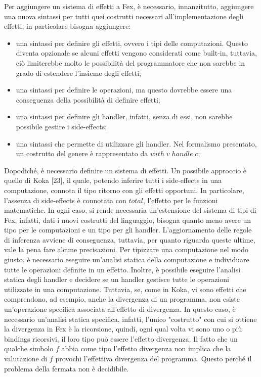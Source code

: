 \documentclass[10pt,a4paper]{article}
\begin{document}
Per aggiungere un sistema di effetti a Fex, è necessario, innanzitutto, aggiungere una nuova sintassi per tutti quei
costrutti necessari all'implementazione degli effetti, in particolare bisogna aggiungere:
\begin{itemize}
    \item una sintassi per definire gli effetti, ovvero i tipi delle computazioni. Questo diventa opzionale se alcuni
    effetti vengono considerati come built-in, tuttavia, ciò limiterebbe molto le possibilità del programmatore che non
    sarebbe in grado di estendere l'insieme degli effetti;
    \item una sintassi per definire le operazioni, ma questo dovrebbe essere una conseguenza della possibilità di
    definire effetti;
    \item una sintassi per definire gli handler, infatti, senza di essi, non sarebbe possibile gestire i side-effects;
    \item una sintassi che permette di utilizzare gli handler. Nel formalismo presentato, un costrutto del genere è
    rappresentato da $ with \; v \; handle \; c $;
\end{itemize}
Dopodiché, è necessario definire un sistema di effetti. Un possibile approccio è quello di Koka [23], il quale, potendo
inferire tutti i side-effects in una computazione, connota il tipo ritorno con gli effetti opportuni. In particolare,
l'assenza di side-effects è connotata con $ total $, l'effetto per le funzioni matematiche. In ogni caso, si rende
necessaria un'estensione del sistema di tipi di Fex, infatti, dati i nuovi costrutti del linguaggio, bisogna quanto
meno avere un tipo per le computazioni e un tipo per gli handler. L'aggiornamento delle regole di inferenza avviene di
conseguenza, tuttavia, per quanto riguarda queste ultime, vale la pena fare alcune precisazioni. Per tipizzare
una computazione nel modo giusto, è necessario eseguire un'analisi statica della computazione e individuare tutte le
operazioni definite in un effetto. Inoltre, è possibile eseguire l'analisi statica degli handler e decidere se un handler
gestisce tutte le operazioni utilizzate in una computazione. Tuttavia, se, come in Koka, vi sono effetti che comprendono,
ad esempio, anche la divergenza di un programma, non esiste un'operazione specifica associata all'effetto di divergenza.
In questo caso, è necessario un'analisi statica specifica, infatti, l'unico "costrutto" con cui si ottiene la divergenza
in Fex è la ricorsione,
quindi, ogni qual volta vi sono uno o più bindings ricorsivi, il loro tipo può essere l'effetto divergenza.
Il fatto che un qualche simbolo $ f $ abbia come tipo l'effetto divergenza non implica che la valutazione di $ f $
provochi l'effettiva divergenza del programma. Questo perché il problema della fermata non è decidibile.
\end{document}
